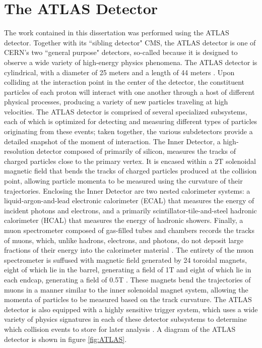 \section{The ATLAS Detector} \label{sec:ATLAS} 

The work contained in this dissertation was performed using the ATLAS detector. Together with its ``sibling detector" CMS, the ATLAS detector is one of CERN's two ``general purpose" detectors, so-called because it is designed to observe a wide variety of high-energy physics phenomena. The ATLAS detector is cylindrical, with a diameter of 25 meters and a length of 44 meters \cite{ATLAS_TDR}. Upon colliding at the interaction point in the center of the detector, the constituent particles of each proton will interact with one another through a host of different physical processes, producing a variety of new particles traveling at high velocities. The ATLAS detector is comprised of several specialized subsystems, each of which is optimized for detecting and measuring different types of particles originating from these events; taken together, the various subdetectors provide a detailed snapshot of the moment of interaction.
	The Inner Detector, a high-resolution detector composed of primarily of silicon, measures the tracks of charged particles close to the primary vertex. It is encased within a 2T solenoidal magnetic field that bends the tracks of charged particles produced at the collision point, allowing particle momenta to be measured using the curvature of their trajectories. Enclosing the Inner Detector are two nested calorimeter systems: a liquid-argon-and-lead electronic calorimeter (ECAL) that measures the energy of incident photons and electrons, and a primarily scintillator-tile-and-steel hadronic calorimeter (HCAL) that measures the energy of hadronic showers. Finally, a muon spectrometer composed of gas-filled tubes and chambers records the tracks of muons, which, unlike hadrons, electrons, and photons, do not deposit large fractions of their energy into the calorimeter material \cite{muonsTDR}.
	The entirety of the muon spectrometer is suffused with magnetic field generated by 24 toroidal magnets, eight of which lie in the barrel, generating a field of 1T and eight of which lie in each endcap, generating a field of 0.5T \cite{DiehlMuons}. These magnets bend the trajectories of muons in a manner similar to the inner solenoidal magnet system, allowing the momenta of particles to be measured based on the track curvature. The ATLAS detector is also equipped with a highly sensitive trigger system, which uses a wide variety of physics signatures in each of these detector subsystems to determine which collision events to store for later analysis \cite{ATLAS_TDR}. A diagram of the ATLAS detector is shown in figure \ref{fig:ATLAS}.

